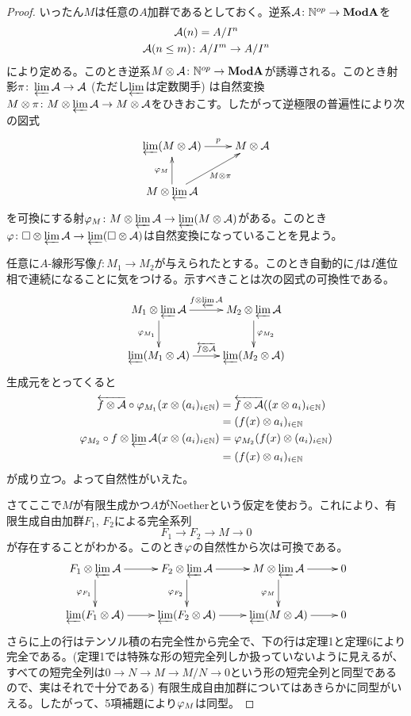 \begin{proof}
  いったん$M$は任意の$A$加群であるとしておく。逆系$\mathcal{A} \colon {\mathbb N}^{op} \to \textbf{Mod}\mathbf{A}$を
  \begin{gather*}
    \mathcal{A}(n) = A/I^n  \\
    \mathcal{A}(n \leq m) \colon A/I^m \to A/I^n
  \end{gather*}
  により定める。このとき逆系$M \otimes \mathcal{A} \colon {\mathbb N}^{op} \to \textbf{Mod}\mathbf{A}$が誘導される。このとき射影$\pi \colon \operatorname*{\varprojlim} \mathcal{A} \to \mathcal{A}$ (ただし$\operatorname*{\varprojlim}$は定数関手) は自然変換$M \otimes \pi \colon M \otimes \operatorname*{\varprojlim} \mathcal{A}  \to M \otimes \mathcal{A} $をひきおこす。したがって逆極限の普遍性により次の図式
  \[
  \xymatrix{
  \llim (M \ts \cala) \ar[r]^-p & M \ts \cala \\
  M \ts \llim \cala \ar[u]^-{\vp_M} \ar[ur]_{M \ts \pi} & {}
  }
  \]
  を可換にする射${\varphi}_M \colon M \otimes \operatorname*{\varprojlim} \mathcal{A} \to \operatorname*{\varprojlim} (M \otimes \mathcal{A})$がある。このとき${\varphi} \colon \square \otimes \operatorname*{\varprojlim} \mathcal{A} \to \operatorname*{\varprojlim} (\square \otimes \mathcal{A})$は自然変換になっていることを見よう。

  任意に$A$-線形写像$f \colon M_1 \to M_2$が与えられたとする。このとき自動的に$f$は$I$進位相で連続になることに気をつける。示すべきことは次の図式の可換性である。
  \[
  \xymatrix{
  M_1 \ts \llim \cala \ar[r]^-{f \ts \llim \cala} \ar[d]_-{\vp_{M_1}} & M_2 \ts \llim \cala \ar[d]^-{\vp_{M_2}} \\
  \llim (M_1 \ts \cala) \ar[r]^-{\la{f \ts \cala}} & \llim (M_2 \ts \cala)
  }
  \]
  生成元をとってくると
  \begin{align*}
    \overleftarrow{f \otimes \mathcal{A}} \circ {\varphi}_{M_1} (x \otimes (a_i)_{i \in {\mathbb N}}) &= \overleftarrow{f \otimes \mathcal{A}} ( (x \otimes a_i)_{i \in {\mathbb N}}) \\
    &= (f (x) \otimes a_i)_{i \in {\mathbb N}} \\
    {\varphi}_{M_2} \circ f \otimes \operatorname*{\varprojlim} \mathcal{A} (x \otimes (a_i)_{i \in {\mathbb N}}) &= {\varphi}_{M_2} (f(x) \otimes (a_i)_{i \in {\mathbb N}}) \\
    &= (f(x) \otimes a_i)_{i \in {\mathbb N}}
  \end{align*}
  が成り立つ。よって自然性がいえた。

  さてここで$M$が有限生成かつ$A$がNoetherという仮定を使おう。これにより、有限生成自由加群$F_1$, $F_2$による完全系列
  \[
  F_1 \to F_2 \to M \to 0
  \]
  が存在することがわかる。このとき${\varphi}$の自然性から次は可換である。
  \[
  \xymatrix{
  F_1 \ts \llim \cala  \ar[r] \ar[d]_-{\vp_{F_1}} & F_2 \ts \llim \cala \ar[r] \ar[d]_-{\vp_{F_2}} & M \ts \llim \cala \ar[r] \ar[d]_-{\vp_{M}} & 0 \\
  \llim (F_1 \ts \cala) \ar[r] & \llim (F_2 \ts \cala) \ar[r] & \llim (M \ts \cala) \ar[r] & 0
  }
  \]
  さらに上の行はテンソル積の右完全性から完全で、下の行は定理1と定理6により完全である。(定理1では特殊な形の短完全列しか扱っていないように見えるが、すべての短完全列は$0 \to N \to M \to M/N \to 0$という形の短完全列と同型であるので、実はそれで十分である) 有限生成自由加群についてはあきらかに同型がいえる。したがって、5項補題により${\varphi}_M$は同型。

\end{proof}


